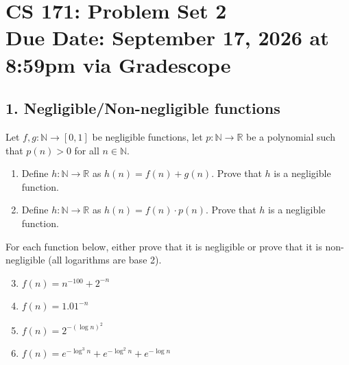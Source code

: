 \documentclass[11pt]{article}
\newcommand{\NN}{\mathbb{N}}
\newcommand{\RR}{\mathbb{R}}
\newcommand{\duedate}{September 17, 2026 at 8:59pm via Gradescope}
\begin{document}
\section*{CS 171: Problem Set 2\\ {\small Due Date: \duedate} }

\subsection*{1. Negligible/Non-negligible functions}
Let $f, g: \NN \rightarrow [0,1]$ be negligible functions, let $p: \NN \rightarrow \RR$ be a polynomial such that $p(n) > 0$ for all $n\in \NN$. 
\begin{enumerate}[label=(\alph*)] 
\item Define $h:\NN \rightarrow \RR$ as $h(n) =f(n)+g(n)$. Prove that $h$ is a negligible function.
\item Define $h:\NN \rightarrow \RR$ as $h(n) =f(n)\cdot p(n)$. Prove that $h$ is a negligible function.
\end{enumerate}
For each function below, either prove that it is negligible or prove that it is non-negligible (all logarithms are base 2).
\begin{enumerate}[label=(\alph*)] 
\setcounter{enumi}{2}
\item $f(n) = n^{-100} + 2^{-n}$
\item $f(n) = 1.01^{-n}$
\item $f(n) = 2^{-(\log n)^2}$
\item $f(n) = e^{-\log^3 n} + e^{-\log^2 n} + e^{-\log n}$
\end{enumerate}
\end{document}
